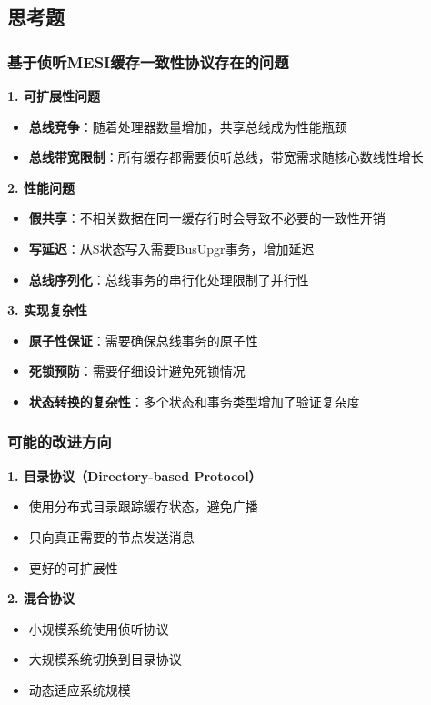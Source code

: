 \documentclass[a4paper]{article}
\begin{document}
\subsection{思考题}

\subsubsection{基于侦听MESI缓存一致性协议存在的问题}

\textbf{1. 可扩展性问题}
\begin{itemize}
    \item \textbf{总线竞争}：随着处理器数量增加，共享总线成为性能瓶颈
    \item \textbf{总线带宽限制}：所有缓存都需要侦听总线，带宽需求随核心数线性增长
\end{itemize}

\textbf{2. 性能问题}
\begin{itemize}
    \item \textbf{假共享}：不相关数据在同一缓存行时会导致不必要的一致性开销
    \item \textbf{写延迟}：从S状态写入需要BusUpgr事务，增加延迟
    \item \textbf{总线序列化}：总线事务的串行化处理限制了并行性
\end{itemize}

\textbf{3. 实现复杂性}
\begin{itemize}
    \item \textbf{原子性保证}：需要确保总线事务的原子性
    \item \textbf{死锁预防}：需要仔细设计避免死锁情况
    \item \textbf{状态转换的复杂性}：多个状态和事务类型增加了验证复杂度
\end{itemize}

\subsubsection{可能的改进方向}

\textbf{1. 目录协议（Directory-based Protocol）}
\begin{itemize}
    \item 使用分布式目录跟踪缓存状态，避免广播
    \item 只向真正需要的节点发送消息
    \item 更好的可扩展性
\end{itemize}

\textbf{2. 混合协议}
\begin{itemize}
    \item 小规模系统使用侦听协议
    \item 大规模系统切换到目录协议
    \item 动态适应系统规模
\end{itemize}
\end{document}
